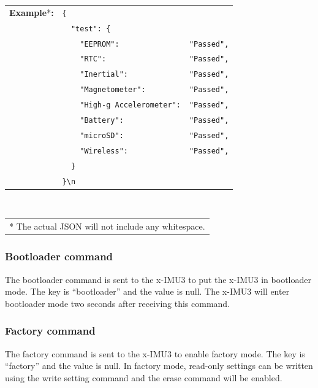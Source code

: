 \begin{table}[H]
    \begin{tabular}{l l l}
        \textbf{Example}*\textbf{:} & \texttt{\{}\\
        & \texttt{~~"test":~\{} &\\
        & \texttt{~~~~"EEPROM":} & \texttt{"Passed",}\\
        & \texttt{~~~~"RTC":} & \texttt{"Passed",}\\
        & \texttt{~~~~"Inertial":} & \texttt{"Passed",}\\
        & \texttt{~~~~"Magnetometer":} & \texttt{"Passed",}\\
        & \texttt{~~~~"High-g Accelerometer":} & \texttt{"Passed",}\\
        & \texttt{~~~~"Battery":} & \texttt{"Passed",}\\
        & \texttt{~~~~"microSD":} & \texttt{"Passed",}\\
        & \texttt{~~~~"Wireless":} & \texttt{"Passed",}\\
        & \texttt{~~\}}\\
        & \texttt{\}\textbackslash n}\\
    \end{tabular}\\
    \begin{tabular}{l}
        \\
        \footnotesize{* The actual \acs{JSON} will not include any whitespace.}
    \end{tabular}
\end{table}

\subsubsection{Bootloader command}

The bootloader command is sent to the x-IMU3 to put the x-IMU3 in bootloader mode.  The key is \enquote{bootloader} and the value is null.  The x-IMU3 will enter bootloader mode two seconds after receiving this command.


\subsubsection{Factory command}

The factory command is sent to the x-IMU3 to enable factory mode.  The key is \enquote{factory} and the value is null.  In factory mode, read-only settings can be written using the write setting command and the erase command will be enabled.

